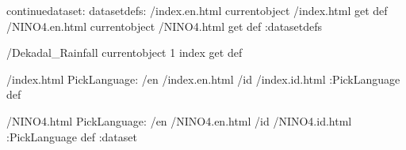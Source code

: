 \begin{ingrid}
continuedataset:
datasetdefs:
/index.en.html currentobject /index.html get def
/NINO4.en.html currentobject /NINO4.html get def
:datasetdefs

/Dekadal_Rainfall currentobject 1 index get def

/index.html {
PickLanguage:
/en /index.en.html
/id /index.id.html
:PickLanguage
} def

/NINO4.html {
PickLanguage:
/en /NINO4.en.html
/id /NINO4.id.html
:PickLanguage
} def
:dataset
\end{ingrid}
